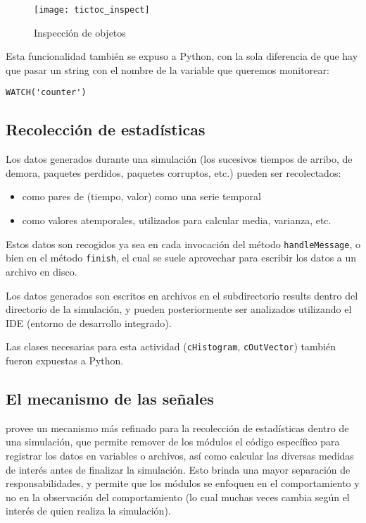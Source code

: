 \begin{figure}[h]
\caption{Inspección de objetos}
\label{fig:tictoc_inspect}
\centering
\texttt{[image: tictoc\_inspect]}
\end{figure}

Esta funcionalidad también se expuso a Python, con la sola diferencia de que
hay que pasar un string con el nombre de la variable que queremos monitorear:

\begin{verbatim}
WATCH('counter')
\end{verbatim}

\subsection{Recolección de estadísticas}

Los datos generados durante una simulación (los sucesivos tiempos de arribo, de
demora, paquetes perdidos, paquetes corruptos, etc.) pueden ser recolectados:

\begin{itemize}
    \item como pares de (tiempo, valor) como una serie temporal
    \item como valores atemporales, utilizados para calcular media, varianza,
etc.
\end{itemize}

Estos datos son recogidos ya sea en cada invocación del método
\verb!handleMessage!, o bien en el método \verb!finish!, el cual se suele
aprovechar para escribir los datos a un archivo en disco.

Los datos generados son escritos en archivos en el subdirectorio results dentro
del directorio de la simulación, y pueden posteriormente ser analizados
utilizando el IDE (entorno de desarrollo integrado).

Las clases necesarias para esta actividad (\verb!cHistogram!,
\verb!cOutVector!) también fueron expuestas a Python.

\subsection{El mecanismo de las señales}

\omnetpp{} provee un mecanismo más refinado para la recolección de estadísticas
dentro de una simulación, que permite remover de los módulos el código
específico para registrar los datos en variables o archivos, así como calcular
las diversas medidas de interés antes de finalizar la simulación. Esto brinda
una mayor separación de responsabilidades, y permite que los módulos se
enfoquen en el comportamiento y no en la observación del comportamiento (lo
cual muchas veces cambia según el interés de quien realiza la simulación).

